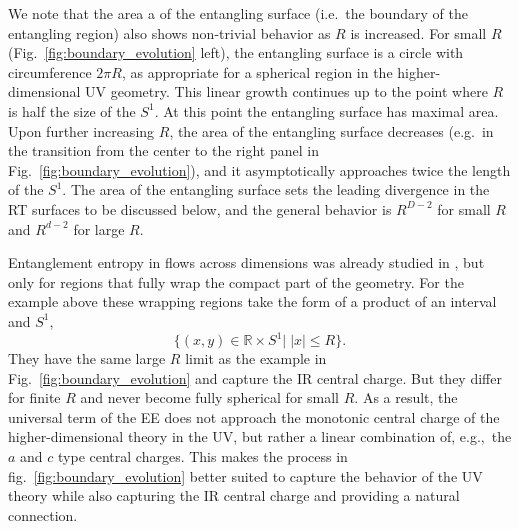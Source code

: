 \documentclass[11 pt]{article}
\begin{document}
We note that the area a of the entangling surface (i.e.\ the boundary of the entangling region) also shows non-trivial behavior as $R$ is increased. For small $R$ (Fig.~\ref{fig:boundary_evolution} left), the entangling surface is a circle with circumference $2\pi R$, as appropriate for a spherical region in the higher-dimensional UV geometry. This linear growth continues up to the point where $R$ is half the size of the $S^1$. At this point the entangling surface has maximal area. Upon further increasing $R$, the area of the entangling surface decreases (e.g.\ in the transition from the center to the right panel in Fig.~\ref{fig:boundary_evolution}), and it asymptotically approaches twice the length of the $S^1$. The area of the entangling surface sets the leading divergence in the RT surfaces to be discussed below, and the general behavior is  $R^{D-2}$ for small $R$ and $R^{d-2}$ for large $R$.

Entanglement entropy in flows across dimensions was already studied in \cite{GonzalezLezcano:2022mcd}, but only for regions that fully wrap the compact part of the geometry. For the example above these wrapping regions take the form of a product of an interval and $S^1$,
$$\{(x,y)\in\mathbb{R}\times S^1|\;|x|\leq R\}.$$ 
They have the same large $R$ limit as the example in Fig.~\ref{fig:boundary_evolution} and capture the IR central charge. But they differ for finite $R$ and never become fully spherical for small $R$. As a result, the universal term of the EE does not approach the monotonic central charge of the higher-dimensional theory in the UV, but rather a linear combination of, e.g.,\ the $a$ and $c$ type central charges. This makes the process in fig.~\ref{fig:boundary_evolution} better suited to capture the behavior of the UV theory while also capturing the IR central charge and providing a natural connection.
\end{document}
